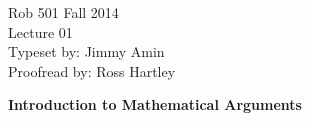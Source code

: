 \documentclass[letterpaper]{article}
\begin{document}
\baselineskip=48pt  %


\setlength{\parskip}{.3in}
\setlength{\itemsep}{.3in}

\pagestyle{plain}

{\Large \bf
\begin{center}
Rob 501 Fall 2014\\
Lecture 01\\
Typeset by:  Jimmy Amin\\
Proofread by: Ross Hartley
\end{center}
}

\Large
\begin{center}
\textbf{Introduction to Mathematical Arguments}
\end{center}
\end{document}
